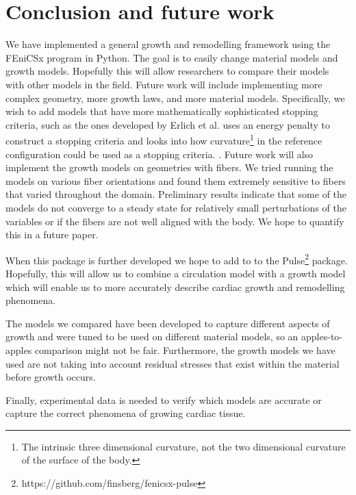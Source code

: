 \section{Conclusion and future work}
We have implemented a general growth and remodelling framework using the FEniCSx program in Python. The goal is to easily change material models and growth models. Hopefully this will allow researchers to compare their models with other models in the field. Future work will include implementing more complex geometry, more growth laws, and more material models. Specifically, we wish to add models that have more mathematically sophisticated stopping criteria, such as the ones developed by Erlich et al. \cite{Erlich2023} uses an energy penalty to construct a stopping criteria and \cite{Erlich2024} looks into how curvature\footnote{The intrinsic three dimensional curvature, not the two dimensional curvature of the surface of the body.} in the reference configuration could be used as a stopping criteria. . Future work will also implement the growth models on geometries with fibers. We tried running the models on various fiber orientations and found them extremely sensitive to fibers that varied throughout the domain. Preliminary results indicate that some of the models do not converge to a steady state for relatively small perturbations of the variables or if the fibers are not well aligned with the body. We hope to quantify this in a future paper. \par
When this package is further developed we hope to add to to the Pulse\footnote{https://github.com/finsberg/fenicsx-pulse} package. Hopefully, this will allow us to combine a circulation model with a growth model which will enable us to more accurately describe cardiac growth and remodelling phenomena. \par
The models we compared have been developed to capture different aspects of growth and were tuned to be used on different material models, so an apples-to-apples comparison might not be fair. Furthermore, the growth models we have used are not taking into account residual stresses that exist within the material before growth occurs. \par
Finally, experimental data is needed to verify which models are accurate or capture the correct phenomena of growing cardiac tissue.


% 
